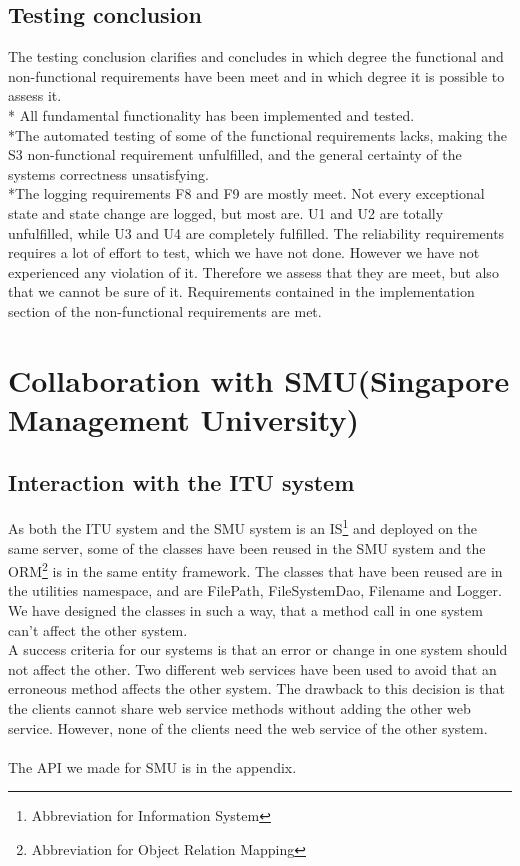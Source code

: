 \documentclass[a4paper,11pt,report]{article}
\begin{document}
\subsection{Testing conclusion}
The testing conclusion clarifies and concludes in which degree the functional and non-functional requirements have been meet and in which degree it is possible to assess it. \\*
All fundamental functionality has been implemented and tested. \\*The automated testing of some of the functional requirements lacks, making the S3 non-functional requirement unfulfilled, and the general certainty of the systems correctness unsatisfying.\\*The logging requirements F8 and F9 are mostly meet. Not every exceptional state and state change are logged, but most are. U1 and U2 are totally unfulfilled, while U3 and U4 are completely fulfilled. The reliability requirements requires a lot of effort to test, which we have not done. However we have not experienced any violation of it. Therefore we assess that they are meet, but also that we cannot be sure of it. Requirements contained in the implementation section of the non-functional requirements are met.


\section{Collaboration with SMU(Singapore Management University)}

\subsection{Interaction with the ITU system}
As both the ITU system and the SMU system is an IS\footnote[2]{Abbreviation for Information System} and deployed on the same server, some of the classes have been reused in the SMU system and the ORM\footnote[3]{Abbreviation for Object Relation Mapping} is in the same entity framework.
The classes that have been reused are in the utilities namespace, and are FilePath, FileSystemDao, Filename and Logger. We have designed the classes in such a way, that a method call in one system can't affect the other system. \\
A success criteria for our systems is that an error or change in one system should not affect the other. Two different web services have been used to avoid that an erroneous method affects the other system.
The drawback to this decision is that the clients cannot share web service methods without adding the other web service. However, none of the clients need the web service of the other system. \\ \\
The API we made for SMU is in the appendix.
\end{document}
